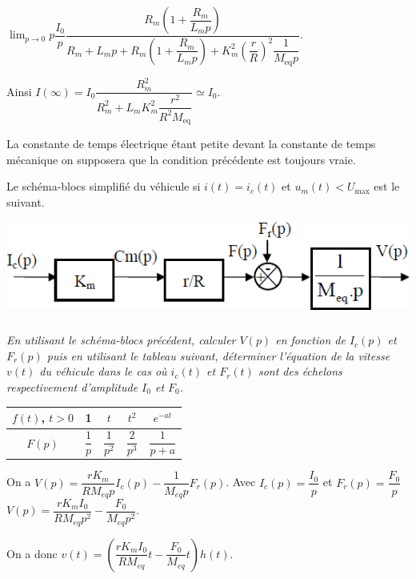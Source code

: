 \documentclass[10pt,fleqn]{article} %
\begin{document}
\begin{multicols}{2}
\begin{corrige}
$ \lim_{p\to 0 } p \dfrac{I_0}{p} \dfrac{ R_m\left( 1+\dfrac{R_m}{L_m p}\right)}{ R_m + L_m p+ R_m\left( 1+\dfrac{R_m}{L_m p}\right) +K_m^2 \left(\dfrac{r}{R}\right)^2 \dfrac{1}{M_{\text{eq}} p}   }$. 

Ainsi $I(\infty) =I_0 \dfrac{ R_m^2}{   R_m^2 + L_m K_m^2 \dfrac{r^2}{R^2M_{\text{eq}}}    } \simeq I_0$.
\end{corrige}
\else
\fi

La constante de temps électrique étant petite devant la constante de temps mécanique on supposera que la condition précédente est toujours vraie.

Le schéma-blocs simplifié du véhicule si $i(t)=i_c(t)$ et $u_m(t)<U_{\text{max}}$ est le suivant.


\begin{center}
\includegraphics[width=\linewidth]{images/ccmp_03}
\end{center}


\subparagraph{}
\textit{En utilisant le schéma-blocs précédent, calculer $V(p)$ en fonction de $I_c(p)$ et $F_r(p)$ puis en utilisant le
tableau suivant, déterminer l’équation de la vitesse $v(t)$ du véhicule dans le cas où $i_c(t)$ et $F_r(t)$
sont des échelons respectivement d’amplitude $I_0$ et $F_0$.}

\begin{center}
\begin{tabular}{|c|c|c|c|c|}
\hline
$f(t)$, $t>0$ & 1 & $t$ & $t^2$ & $e^{-at}$  \\
\hline
$F(p)$ & $\dfrac{1}{p}$ & $\dfrac{1}{p^2}$ & $\dfrac{2}{p^3}$ & $\dfrac{1}{p+a}$ \\
\hline
\end{tabular}
\end{center}

\ifprof
\begin{corrige}
On a $V(p)= \dfrac{rK_m}{RM_{eq}p}I_c(p) - \dfrac{1}{M_{eq}p} F_r(p)$.
Avec $I_c(p) =\dfrac{I_0}{p}$ et $F_r(p) =\dfrac{F_0}{p}$
$V(p)= \dfrac{rK_mI_0}{RM_{eq}p^2} - \dfrac{F_0}{M_{eq}p^2} $.

On a donc $v(t)= \left( \dfrac{rK_mI_0}{RM_{eq}}t - \dfrac{F_0}{M_{eq}}t\right) h(t) $.

\end{corrige}
\else
\fi


\end{multicols}
\end{document}
